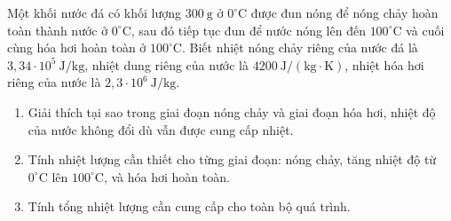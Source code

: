 \begin{bt}
	{\color{red}\footnotesize\ttfamily [L12C1B1-TL-4]}\par %
	Một khối nước đá có khối lượng $300\ \mathrm{g}$ ở $0^\circ\mathrm{C}$ được đun nóng để nóng chảy hoàn toàn thành nước ở $0^\circ\mathrm{C}$, sau đó tiếp tục đun để nước nóng lên đến $100^\circ\mathrm{C}$ và cuối cùng hóa hơi hoàn toàn ở $100^\circ\mathrm{C}$. Biết nhiệt nóng chảy riêng của nước đá là $3{,}34 \cdot 10^5\ \mathrm{J/kg}$, nhiệt dung riêng của nước là $4200\ \mathrm{J/(kg\cdot K)}$, nhiệt hóa hơi riêng của nước là $2{,}3 \cdot 10^6\ \mathrm{J/kg}$.
	\begin{enumerate}
		\item Giải thích tại sao trong giai đoạn nóng chảy và giai đoạn hóa hơi, nhiệt độ của nước không đổi dù vẫn được cung cấp nhiệt.
		\item Tính nhiệt lượng cần thiết cho từng giai đoạn: nóng chảy, tăng nhiệt độ từ $0^\circ\mathrm{C}$ lên $100^\circ\mathrm{C}$, và hóa hơi hoàn toàn.
		\item Tính tổng nhiệt lượng cần cung cấp cho toàn bộ quá trình.
	\end{enumerate}
\end{bt}

